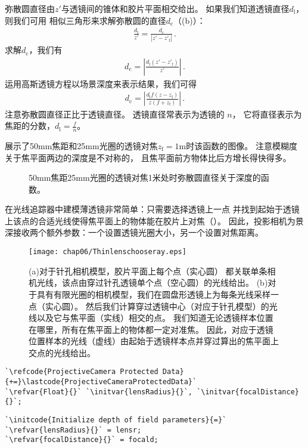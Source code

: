 弥散圆直径由$z'$与透镜间的锥体和胶片平面相交给出。
如果我们知道透镜直径$d_{\mathrm{l}}$，则我们可用
相似三角形来求解弥散圆的直径$d_{\mathrm{c}}$（(b)）：
\begin{align*}
    \frac{d_{\mathrm{l}}}{z'}=\frac{d_{\mathrm{c}}}{|z'-z'_{\mathrm{f}}|}\, .
\end{align*}
求解$d_{\mathrm{c}}$，我们有
\begin{align*}
    d_{\mathrm{c}}=\left|\frac{d_{\mathrm{l}}(z'-z'_{\mathrm{f}})}{z'}\right|\, .
\end{align*}
运用高斯透镜方程以场景深度来表示结果，我们可得
\begin{align*}
    d_{\mathrm{c}}=\left|\frac{d_{\mathrm{l}}f(z-z_{\mathrm{f}})}{z(f+z_{\mathrm{f}})}\right|\, .
\end{align*}
注意弥散圆直径正比于透镜直径。
透镜直径常表示为透镜的
$n$，
它将直径表示为焦距的分数，$\displaystyle d_{\mathrm{l}}=\frac{f}{n}$。

展示了50mm焦距和25mm光圈的透镜对焦$z_{\mathrm{f}}=1$m时该函数的图像。
注意模糊度关于焦平面两边的深度是不对称的，
且焦平面前方物体比后方增长得快得多。
\begin{figure}[htbp]
    \centering
    \caption{50mm焦距25mm光圈的透镜对焦1米处时弥散圆直径关于深度的函数。}
    \label{fig:6.11}
\end{figure}

在光线追踪器中建模薄透镜非常简单：只需要选择透镜上一点
并找到起始于透镜上该点的合适光线使得焦平面上的物体能在胶片上对焦（）。
因此，投影相机为景深接收两个额外参数：一个设置透镜光圈大小，另一个设置对焦距离。
\begin{figure}[htbp]
    \centering\texttt{[image: chap06/Thinlenschooseray.eps]}
    \caption{(a)对于针孔相机模型，胶片平面上每个点（实心圆）
    都关联单条相机光线，该点由穿过针孔透镜单个点（空心圆）的光线给出。
    (b)对于具有有限光圈的相机模型，我们在圆盘形透镜上为每条光线采样一点（实心圆）。
    然后我们计算穿过透镜中心（对应于针孔模型）的光线以及它与焦平面（实线）相交的点。
    我们知道无论透镜样本位置在哪里，所有在焦平面上的物体都一定对准焦。
    因此，对应于透镜位置样本的光线（虚线）由起始于透镜样本点并穿过算出的焦平面上交点的光线给出。}
    \label{fig:6.12}
\end{figure}

\begin{lstlisting}
`\refcode{ProjectiveCamera Protected Data}{+=}\lastcode{ProjectiveCameraProtectedData}`
`\refvar{Float}{}` `\initvar{lensRadius}{}`, `\initvar{focalDistance}{}`;
\end{lstlisting}
\begin{lstlisting}
`\initcode{Initialize depth of field parameters}{=}`
`\refvar{lensRadius}{}` = lensr;
`\refvar{focalDistance}{}` = focald;
\end{lstlisting}


